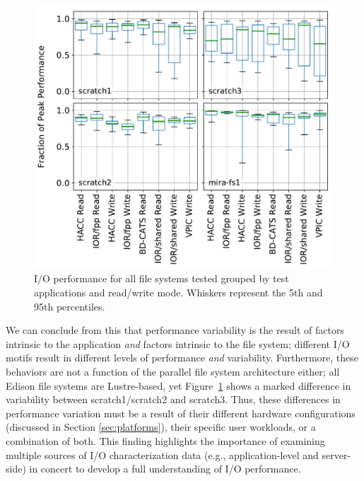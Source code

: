 \begin{figure}[t]
    \centering
    \includegraphics[width=1.0\columnwidth]{figs/perf-boxplots.pdf}
    \caption{I/O performance for all file systems tested grouped by test
    applications and read/write mode.  Whiskers represent the 5th and 95th
    percentiles.}
    \label{fig:perf-summary-boxplots-motif}
\vspace{-.2in}
\end{figure}

We can conclude from this that performance variability is the result of factors intrinsic to the application \emph{and} factors intrinsic to the file system;
different I/O motifs result in different levels of performance \emph{and} variability.
Furthermore, these behaviors are not a function of the parallel file system architecture either; all Edison file systems are Lustre-based, yet Figure~\ref{fig:perf-summary-boxplots-motif} shows a marked difference in variability between scratch1/scratch2 and scratch3.
Thus, these differences in performance variation must be a result of their different hardware configurations (discussed in Section \ref{sec:platforms}), their specific user workloads, or a combination of both.
This finding highlights the importance of examining multiple sources of I/O characterization data (e.g., application-level and server-side) in concert to develop a full understanding of I/O performance.


